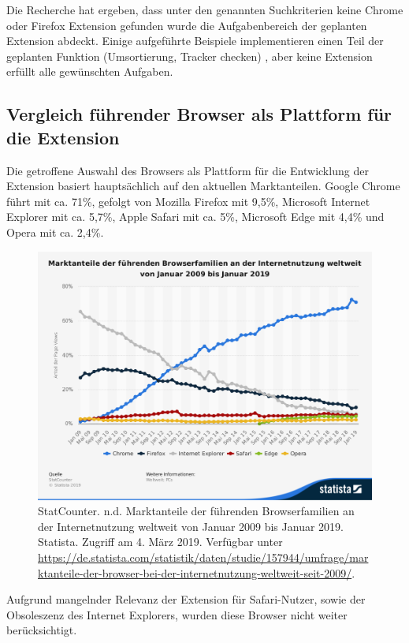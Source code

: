 Die Recherche hat ergeben, dass unter den genannten Suchkriterien keine Chrome oder Firefox Extension gefunden wurde die Aufgabenbereich der geplanten Extension abdeckt. Einige aufgeführte Beispiele implementieren einen Teil der geplanten Funktion (Umsortierung, Tracker checken) , aber keine Extension erfüllt alle gewünschten Aufgaben.


\subsection{Vergleich führender Browser als Plattform für die Extension}
\label{ss:vergleichbrowser}
Die getroffene Auswahl des Browsers als Plattform für die Entwicklung der Extension basiert hauptsächlich auf den aktuellen Marktanteilen. Google Chrome führt mit ca. 71\%, gefolgt von Mozilla Firefox mit 9,5\%, Microsoft Internet Explorer mit ca. 5,7\%, Apple Safari mit ca. 5\%, Microsoft Edge mit 4,4\% und Opera mit ca. 2,4\%.

\begin{figure}[ht]
	\centering
	\includegraphics[width=1\textwidth]{pics/MarktanteileBrowser.png}
	\caption{StatCounter. n.d. Marktanteile der führenden Browserfamilien an der Internetnutzung weltweit von Januar 2009 bis Januar 2019. Statista. Zugriff am 4. März 2019. Verfügbar unter \url{https://de.statista.com/statistik/daten/studie/157944/umfrage/marktanteile-der-browser-bei-der-internetnutzung-weltweit-seit-2009/}.}
	\label{marktanteilebrowser}
\end{figure}
Aufgrund mangelnder Relevanz der Extension für Safari-Nutzer, sowie der Obsoleszenz des Internet Explorers, wurden diese Browser nicht weiter berücksichtigt.

